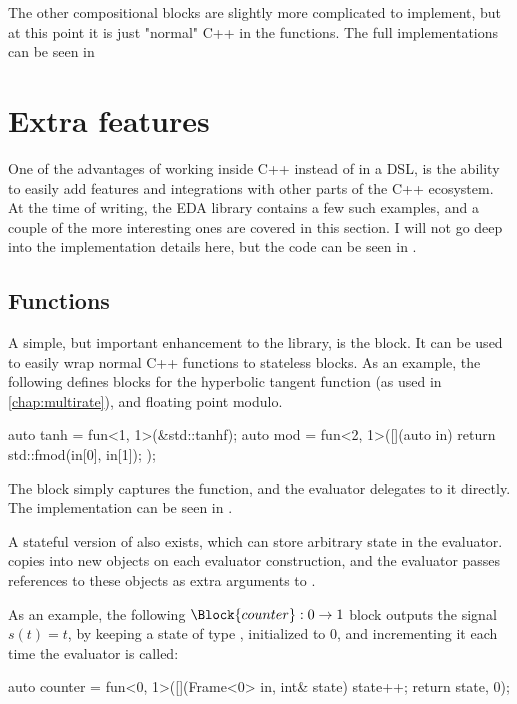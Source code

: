 The other compositional blocks are slightly more complicated to implement, but at this point it is just
"normal" C++ in the  functions. The full implementations can be seen in 

\section{Extra features}

One of the advantages of working inside C++ instead of in a DSL, is the ability to easily add features and
integrations with other parts of the C++ ecosystem. At the time of writing, the EDA library contains a few
such examples, and a couple of the more interesting ones are covered in this section. I will not go deep into
the implementation details here, but the code can be seen in .

\subsection{Functions}

A simple, but important enhancement to the library, is the  block. It can be used to
easily wrap normal C++ functions to stateless blocks. As an example, the following defines blocks for the
hyperbolic tangent function (as used in \autoref{chap:multirate}), and floating point modulo.

\begin{cppcodenl}
  auto tanh = fun<1, 1>(&std::tanhf);
  auto mod = fun<2, 1>([](auto in) { return std::fmod(in[0], in[1]); });
\end{cppcodenl}

The  block simply captures the function, and the evaluator delegates to it directly.
The implementation can be seen in .

A stateful version of  also exists, which can store arbitrary state in the evaluator.  copies 
into new objects on each evaluator construction, and the evaluator passes references to these objects as
extra arguments to .

As an example, the following $\Block{counter} : 0 \rightarrow 1$ block outputs the signal $s(t) = t$, by
keeping a state of type , initialized to $0$, and incrementing it
each time the evaluator is called:

\begin{cppcodenl}
  auto counter = fun<0, 1>([](Frame<0> in, int& state) { state++; return {state}}, 0);
\end{cppcodenl}


